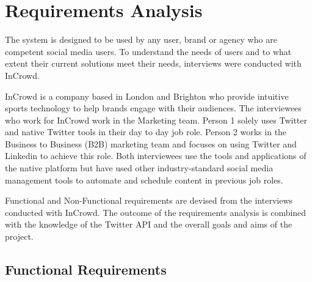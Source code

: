 \chapter{Requirements Analysis}

The system is designed to be used by any user, brand or agency who are competent social media users. To understand the needs of users and to what extent their current solutions meet their needs, interviews were conducted with InCrowd. \newline \par

InCrowd is a company based in London and Brighton who provide intuitive sports technology to help brands engage with their audiences. The interviewees who work for InCrowd work in the Marketing team. Person 1 solely uses Twitter and native Twitter tools in their day to day job role. Person 2 works in the Business to Business (B2B) marketing team and focuses on using Twitter and Linkedin to achieve this role. Both interviewees use the tools and applications of the native platform but have used other industry-standard social media management tools to automate and schedule content in previous job roles. \newline \par

Functional and Non-Functional requirements are devised from the interviews conducted with InCrowd. The outcome of the requirements analysis is combined with the knowledge of the Twitter API and the overall goals and aims of the project. 

\section{Functional Requirements}

